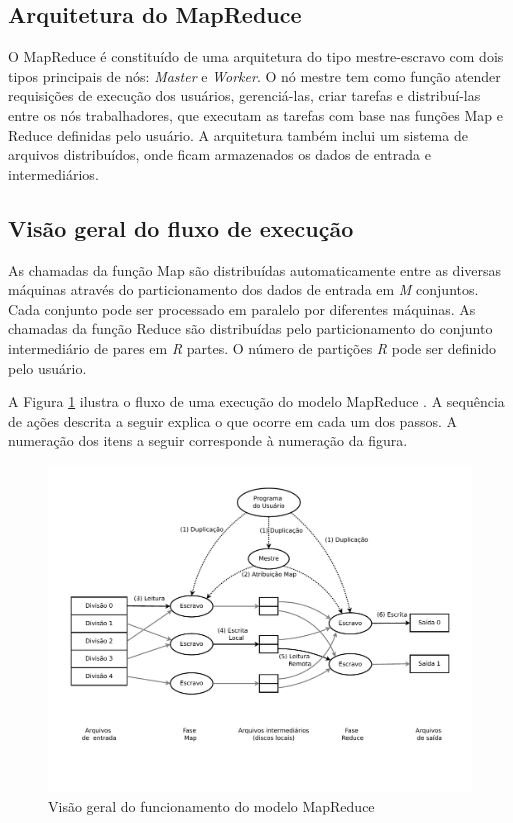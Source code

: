 \subsection{Arquitetura do MapReduce}
O MapReduce é constituído de uma arquitetura do tipo mestre-escravo com dois tipos principais de nós: \textit{Master} e \textit{Worker}. O nó mestre tem como função atender requisições de execução dos usuários, gerenciá-las, criar tarefas e distribuí-las entre os nós trabalhadores, que executam as tarefas com base nas funções Map e Reduce definidas pelo usuário.
A arquitetura também inclui um sistema de arquivos distribuídos, onde ficam armazenados os dados de entrada e intermediários.



\subsection{Visão geral do fluxo de execução}


As chamadas da função Map são distribuídas automaticamente entre as diversas máquinas através do particionamento dos dados de entrada em \textit{M} conjuntos. Cada conjunto pode ser processado em paralelo por diferentes máquinas. As chamadas da função Reduce são distribuídas pelo particionamento do conjunto intermediário de pares em \textit{R} partes. O número de partições \textit{R} pode ser definido pelo usuário.

A Figura \ref{fig:MapReduceoverview} ilustra o fluxo de uma execução do modelo MapReduce \cite{Dean:2008}. A sequência de ações descrita a seguir explica o que ocorre em cada um dos passos. A numeração dos itens a seguir corresponde à numeração da figura.

 \begin{figure}[!htb]
 \centering
\includegraphics[trim=0cm 2cm 0cm 1cm, width=\textwidth]{figuras/MapReduceOverflow.pdf}
\caption{Visão geral do funcionamento do modelo MapReduce}
\label{fig:MapReduceoverview}
\end{figure}


